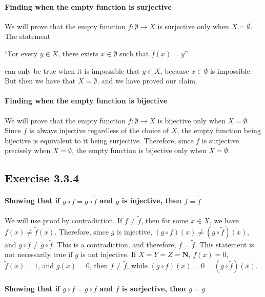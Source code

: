 \documentclass[12pt, oneside]{book}
\begin{document}
	\paragraph*{Finding when the empty function is surjective}

	We will prove that the empty function $f \colon \emptyset \rightarrow X$ is surjective only when $X = \emptyset$. The statement
	\begin{center}
		``For every $y \in X$, there exists $x \in \emptyset$ such that $f(x) = y$''
	\end{center}
	can only be true when it is impossible that $y \in X$, because $x \in \emptyset$ is impossible. But then we have that $X = \emptyset$, and we have proved our claim.

	\paragraph*{Finding when the empty function is bijective}

	We will prove that the empty function $f \colon \emptyset \rightarrow X$ is bijective only when $X = \emptyset$. Since $f$ is always injective regardless of the choice of $X$, the empty function being bijective is equivalent to it being surjective. Therefore, since $f$ is surjective precisely when $X = \emptyset$, the empty function is bijective only when $X = \emptyset$.

	\subsection*{Exercise 3.3.4}

	\paragraph*{Showing that if $g \circ f = g \circ \tilde{f}$ and $g$ is injective, then $f = \tilde{f}$}

	We will use proof by contradiction. If $f \ne \tilde{f}$, then for some $x \in X$, we have $f(x) \ne \tilde{f}(x)$. Therefore, since $g$ is injective, $(g \circ f)(x) \ne (g \circ \tilde{f})(x)$, and $g \circ f \ne g \circ \tilde{f}$. This is a contradiction, and therefore, $f = \tilde{f}$. This statement is not necessarily true if $g$ is not injective. If $X = Y = Z = \mathbf{N}$, $f(x) = 0$, $\tilde{f}(x) = 1$, and $g(x) = 0$, then $f \ne \tilde{f}$, while $(g \circ f)(x) = 0 = (g \circ \tilde{f})(x)$.

	\paragraph*{Showing that if $g \circ f = \tilde{g} \circ f$ and $f$ is surjective, then $g = \tilde{g}$}
\end{document}
